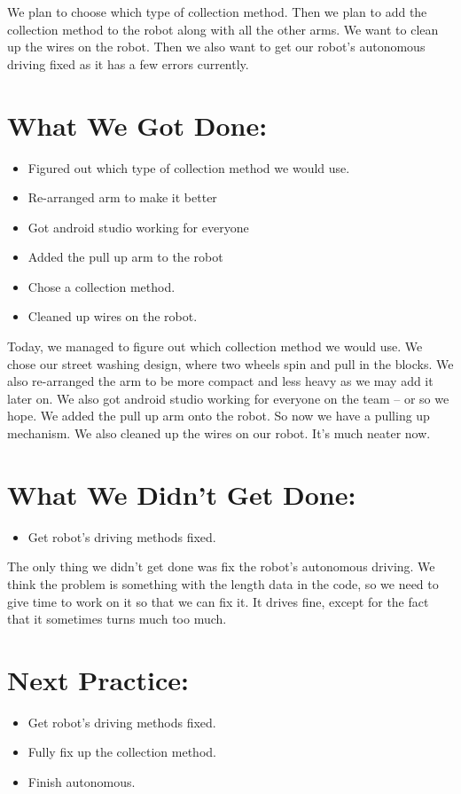 \documentclass[12pt]{article}
\begin{document}
We plan to choose which type of collection method. Then we plan to add the collection method to the robot along with all the other arms. We want to clean up the wires on the robot. Then we also want to get our robot's autonomous driving fixed as it has a few errors currently.

\section{What We Got Done:} 
\begin{itemize}
	\item Figured out which type of collection method we would use.
	\item Re-arranged arm to make it better
	\item Got android studio working for everyone
	\item Added the pull up arm to the robot
	\item Chose a collection method.
	\item Cleaned up wires on the robot.
\end{itemize}

Today, we managed to figure out which collection method we would use. We chose our street washing design, where two wheels spin and pull in the blocks. We also re-arranged the arm to be more compact and less heavy as we may add it later on. We also got android studio working for everyone on the team -- or so we hope. We added the pull up arm onto the robot. So now we have a pulling up mechanism. We also cleaned up the wires on our robot. It's much neater now.

\section{What We Didn't Get Done:}
\begin{itemize}
	\item Get robot's driving methods fixed.
\end{itemize}

The only thing we didn't get done was fix the robot's autonomous driving. We think the problem is something with the length data in the code, so we need to give time to work on it so that we can fix it. It drives fine, except for the fact that it sometimes turns much too much.

\section{Next Practice:}
\begin{itemize}
	\item Get robot's driving methods fixed.
	\item Fully fix up the collection method.
	\item Finish autonomous.
\end{itemize}
\end{document}
